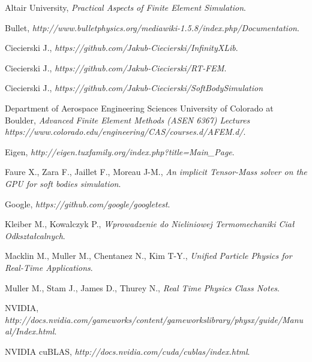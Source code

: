 \documentclass[en]{minipw} %
\begin{document}
\renewcommand{\bibname}{References}
\begin{thebibliography}{25}%


 Altair University, \emph{Practical Aspects of Finite Element Simulation}.

 Bullet, \emph{http://www.bulletphysics.org/mediawiki-1.5.8/index.php/Documentation}.

 Ciecierski J., \emph{https://github.com/Jakub-Ciecierski/InfinityXLib}.

 Ciecierski J., \emph{https://github.com/Jakub-Ciecierski/RT-FEM}.

  Ciecierski J., \emph{https://github.com/Jakub-Ciecierski/SoftBodySimulation}

 Department of Aerospace Engineering Sciences University of Colorado at Boulder, \emph{Advanced Finite Element Methods (ASEN 6367) Lectures https://www.colorado.edu/engineering/CAS/courses.d/AFEM.d/}.

 Eigen, \emph{http://eigen.tuxfamily.org/index.php?title=Main\_Page}.

 Faure X., Zara F., Jaillet F., Moreau J-M.,  \emph{An implicit Tensor-Mass solver on the GPU for soft bodies simulation}.

 Google, \emph{https://github.com/google/googletest}.

 Kleiber M., Kowalczyk P., \emph{Wprowadzenie do Nieliniowej Termomechaniki Ciał Odkształcalnych}.


 Macklin M., Muller M., Chentanez N., Kim T-Y., \emph{Unified Particle Physics for Real-Time Applications}.

 Muller M., Stam J., James D., Thurey N., \emph{Real Time Physics Class Notes}.

 NVIDIA, \emph{http://docs.nvidia.com/gameworks/content/gameworkslibrary/physx/guide/Manual/Index.html}.

 NVIDIA cuBLAS, \emph{http://docs.nvidia.com/cuda/cublas/index.html}.


\end{thebibliography}
\end{document}
